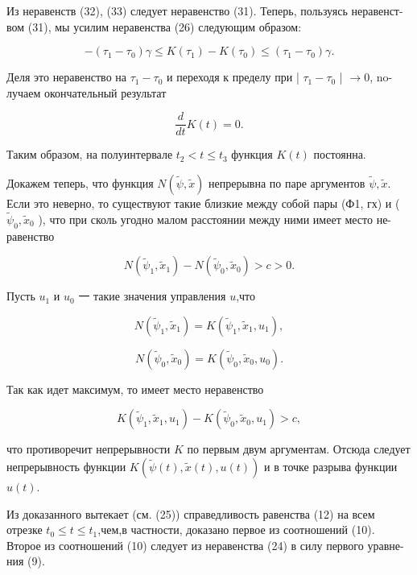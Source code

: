 \documentclass[10pt]{article}
\begin{document}
Из неравенств (32), (33) следует неравенство (31). Теперь, пользуясь неравенст- вом (31), мы усилим неравенства (26) следующим образом:

\[
- \left( {{\tau }_{1} - {\tau }_{0}}\right) \gamma  \leq  K\left( {\tau }_{1}\right)  - K\left( {\tau }_{0}\right)  \leq  \left( {{\tau }_{1} - {\tau }_{0}}\right) \gamma.
\]

Деля это неравенство на \({\tau }_{1} - {\tau }_{0}\) и переходя к пределу при | \({\tau }_{1} - {\tau }_{0}\) | \(\rightarrow  0\), no- лучаем окончательный результат

\[
\frac{d}{dt}K\left( t\right)  = 0.
\]

Таким образом, на полуинтервале \({t}_{2} < t \leq  {t}_{3}\) функция \(K\left( t\right)\) постоянна.

Докажем теперь, что функция \(N\left( {\widetilde{\psi },\widetilde{x}}\right)\) непрерывна по паре аргументов \(\widetilde{\psi },\widetilde{x}\). Если это неверно, то существуют такие близкие между собой пары (Ф1, гх) и ( \({\widetilde{\psi }}_{0},{\widetilde{x}}_{0}\) ), что при сколь угодно малом расстоянии между ними имеет место не- равенство

\[
N\left( {{\widetilde{\psi }}_{1},{\widetilde{x}}_{1}}\right)  - N\left( {{\widetilde{\psi }}_{0},{\widetilde{x}}_{0}}\right)  > c > 0.
\]

Пусть \({u}_{1}\) и \({u}_{0}\) 一 такие значения управления \(u\),что

\[
N\left( {{\widetilde{\psi }}_{1},{\widetilde{x}}_{1}}\right)  = K\left( {{\widetilde{\psi }}_{1},{\widetilde{x}}_{1},{u}_{1}}\right),
\]

\[
N\left( {{\widetilde{\psi }}_{0},{\widetilde{x}}_{0}}\right)  = K\left( {{\widetilde{\psi }}_{0},{\widetilde{x}}_{0},{u}_{0}}\right).
\]

Так как идет максимум, то имеет место неравенство

\[
K\left( {{\widetilde{\psi }}_{1},{\widetilde{x}}_{1},{u}_{1}}\right)  - K\left( {{\widetilde{\psi }}_{0},{\widetilde{x}}_{0},{u}_{1}}\right)  > c,
\]

что противоречит непрерывности \(K\) по первым двум аргументам. Отсюда следует непрерывность функции \(K\left( {\widetilde{\psi }\left( t\right),\widetilde{x}\left( t\right),u\left( t\right) }\right)\) и в точке разрыва функции \(u\left( t\right)\).

Из доказанного вытекает (см. (25)) справедливость равенства (12) на всем отрезке \({t}_{0} \leq  t \leq  {t}_{1}\),чем,в частности, доказано первое из соотношений (10). Второе из соотношений (10) следует из неравенства (24) в силу первого уравне- ния (9).
\end{document}
